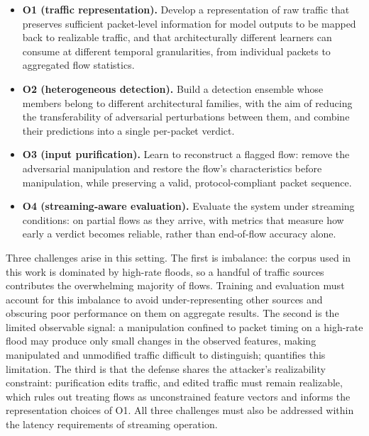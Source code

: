 \begin{itemize}
    \item \textbf{O1 (traffic representation).} Develop a representation of raw
    traffic that preserves sufficient packet-level information for model outputs to be
    mapped back to realizable traffic, and that architecturally different learners can
    consume at different temporal granularities, from individual packets to aggregated
    flow statistics.
    \item \textbf{O2 (heterogeneous detection).} Build a detection ensemble whose
    members belong to different architectural families, with the aim of reducing the transferability of adversarial perturbations between them, and combine their
    predictions into a single per-packet verdict.
    \item \textbf{O3 (input purification).} Learn to reconstruct a flagged flow:
    remove the adversarial manipulation and restore the flow's characteristics before manipulation,
    while preserving a valid, protocol-compliant packet sequence.
    \item \textbf{O4 (streaming-aware evaluation).} Evaluate the system under streaming conditions: on partial flows as they arrive, with metrics that measure how early
    a verdict becomes reliable, rather than end-of-flow accuracy alone.
\end{itemize}

Three challenges arise in this setting. The first is imbalance: the corpus used in this work is dominated
by high-rate floods, so a handful of traffic sources contributes the overwhelming
majority of flows. 
Training and evaluation must account for this imbalance to avoid under-representing other sources and obscuring poor performance on them on aggregate results. 
The second is the
limited observable signal: a manipulation confined to packet timing on a high-rate flood
may produce only small changes in the observed features, making manipulated and unmodified traffic difficult to distinguish;  quantifies this limitation.
The third is that the defense
shares the attacker's realizability constraint: purification edits traffic, and edited traffic must
remain realizable, which rules out treating flows as unconstrained feature vectors and informs the
representation choices of O1. All three challenges must also be addressed within the latency requirements of streaming operation.

